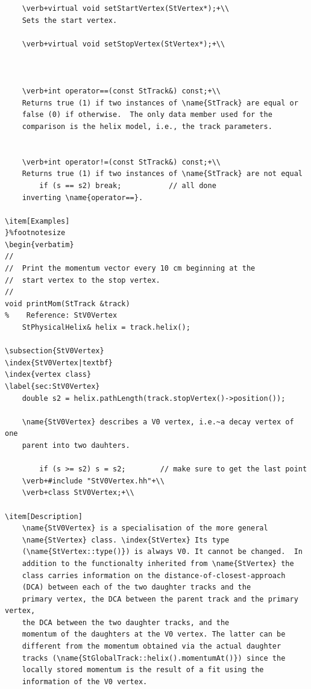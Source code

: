 \begin{enumerate}
\begin{Entry}
\begin{Entry}
{\begin{verbatim}
    \verb+virtual void setStartVertex(StVertex*);+\\
    Sets the start vertex.

    \verb+virtual void setStopVertex(StVertex*);+\\
    
    
    
    \verb+int operator==(const StTrack&) const;+\\
    Returns true (1) if two instances of \name{StTrack} are equal or
    false (0) if otherwise.  The only data member used for the
    comparison is the helix model, i.e., the track parameters.
    

    \verb+int operator!=(const StTrack&) const;+\\
    Returns true (1) if two instances of \name{StTrack} are not equal
        if (s == s2) break;           // all done     
    inverting \name{operator==}.

\item[Examples]
}%footnotesize    
\begin{verbatim}
//
//  Print the momentum vector every 10 cm beginning at the
//  start vertex to the stop vertex.
//
void printMom(StTrack &track)
%    Reference: StV0Vertex
    StPhysicalHelix& helix = track.helix();

\subsection{StV0Vertex}
\index{StV0Vertex|textbf}
\index{vertex class}
\label{sec:StV0Vertex}
    double s2 = helix.pathLength(track.stopVertex()->position());

    \name{StV0Vertex} describes a V0 vertex, i.e.~a decay vertex of one
    parent into two dauhters.
    
        if (s >= s2) s = s2;        // make sure to get the last point
    \verb+#include "StV0Vertex.hh"+\\
    \verb+class StV0Vertex;+\\
  
\item[Description] 
    \name{StV0Vertex} is a specialisation of the more general
    \name{StVertex} class. \index{StVertex} Its type
    (\name{StVertex::type()}) is always V0. It cannot be changed.  In
    addition to the functionalty inherited from \name{StVertex} the
    class carries information on the distance-of-closest-approach
    (DCA) between each of the two daughter tracks and the
    primary vertex, the DCA between the parent track and the primary vertex, 
    the DCA between the two daughter tracks, and the
    momentum of the daughters at the V0 vertex. The latter can be
    different from the momentum obtained via the actual daughter
    tracks (\name{StGlobalTrack::helix().momentumAt()}) since the
    locally stored momentum is the result of a fit using the
    information of the V0 vertex.
    

\end{verbatim}}
\end{Entry}
\end{Entry}
\end{enumerate}
